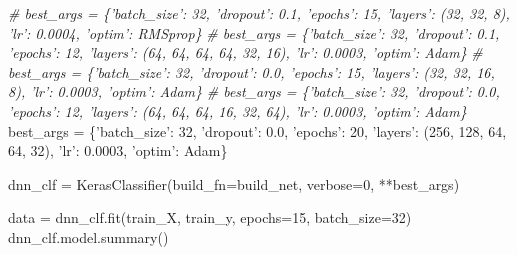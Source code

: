 \documentclass[]{article}
\newenvironment{Shaded}{}{}
\newcommand{\CommentTok}[1]{\textcolor[rgb]{0.38,0.63,0.69}{\textit{#1}}}
\newcommand{\DecValTok}[1]{\textcolor[rgb]{0.25,0.63,0.44}{#1}}
\newcommand{\FloatTok}[1]{\textcolor[rgb]{0.25,0.63,0.44}{#1}}
\newcommand{\NormalTok}[1]{#1}
\newcommand{\OperatorTok}[1]{\textcolor[rgb]{0.40,0.40,0.40}{#1}}
\newcommand{\StringTok}[1]{\textcolor[rgb]{0.25,0.44,0.63}{#1}}
\begin{document}
\begin{Shaded}
\begin{Highlighting}[]
\CommentTok{# best_args = \{'batch_size': 32, 'dropout': 0.1, 'epochs': 15, 'layers': (32, 32, 8), 'lr': 0.0004, 'optim': RMSprop\}}
\CommentTok{# best_args = \{'batch_size': 32, 'dropout': 0.1, 'epochs': 12, 'layers': (64, 64, 64, 64, 32, 16), 'lr': 0.0003, 'optim': Adam\}}
\CommentTok{# best_args = \{'batch_size': 32, 'dropout': 0.0, 'epochs': 15, 'layers': (32, 32, 16, 8), 'lr': 0.0003, 'optim': Adam\}}
\CommentTok{# best_args = \{'batch_size': 32, 'dropout': 0.0, 'epochs': 12, 'layers': (64, 64, 64, 16, 32, 64), 'lr': 0.0003, 'optim': Adam\}}
\NormalTok{best_args }\OperatorTok{=}\NormalTok{ \{}\StringTok{'batch_size'}\NormalTok{: }\DecValTok{32}\NormalTok{, }\StringTok{'dropout'}\NormalTok{: }\FloatTok{0.0}\NormalTok{, }\StringTok{'epochs'}\NormalTok{: }\DecValTok{20}\NormalTok{, }\StringTok{'layers'}\NormalTok{: (}\DecValTok{256}\NormalTok{, }\DecValTok{128}\NormalTok{, }\DecValTok{64}\NormalTok{, }\DecValTok{64}\NormalTok{, }\DecValTok{32}\NormalTok{), }\StringTok{'lr'}\NormalTok{: }\FloatTok{0.0003}\NormalTok{, }\StringTok{'optim'}\NormalTok{: Adam\}}

\NormalTok{dnn_clf }\OperatorTok{=}\NormalTok{ KerasClassifier(build_fn}\OperatorTok{=}\NormalTok{build_net, verbose}\OperatorTok{=}\DecValTok{0}\NormalTok{, }\OperatorTok{**}\NormalTok{best_args)}

\NormalTok{data }\OperatorTok{=}\NormalTok{ dnn_clf.fit(train_X, train_y, epochs}\OperatorTok{=}\DecValTok{15}\NormalTok{, batch_size}\OperatorTok{=}\DecValTok{32}\NormalTok{)}
\NormalTok{dnn_clf.model.summary()}
\end{Highlighting}
\end{Shaded}
\end{document}
